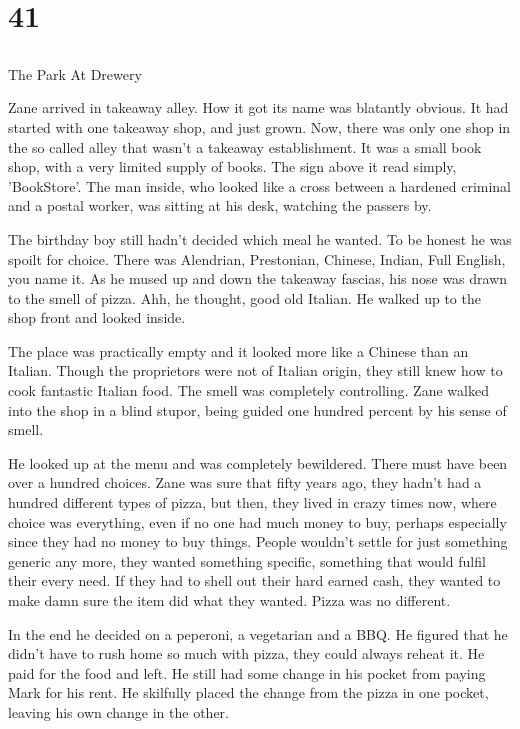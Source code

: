 \chapter{41}
\section{}
The Park At Drewery  

Zane arrived in takeaway alley.  How it got its name was blatantly obvious.  It had started with one takeaway shop, and just grown.  Now, there was only one shop in the so called alley that wasn't a takeaway establishment.  It was a small book shop, with a very limited supply of books.  The sign above it read simply, 'BookStore'.  The man inside, who looked like a cross between a hardened criminal and a postal worker, was sitting at his desk, watching the passers by.  

The birthday boy still hadn't decided which meal he wanted.  To be honest he was spoilt for choice.  There was Alendrian, Prestonian, Chinese, Indian, Full English, you name it.  As he mused up and down the takeaway fascias, his nose was drawn to the smell of pizza.  Ahh, he thought, good old Italian.  He walked up to the shop front and looked inside.  

The place was practically empty and it looked more like a Chinese than an Italian.  Though the proprietors were not of Italian origin, they still knew how to cook fantastic Italian food.  The smell was completely controlling.  Zane walked into the shop in a blind stupor, being guided one hundred percent by his sense of smell.

He looked up at the menu and was completely bewildered.  There must have been over a hundred choices.  Zane was sure that fifty years ago, they hadn't had a hundred different types of pizza, but then, they lived in crazy times now, where choice was everything, even if no one had much money to buy, perhaps especially since they had no money to buy things.  People wouldn't settle for just something generic any more, they wanted something specific, something that would fulfil their every need.  If they had to shell out their hard earned cash, they wanted to make damn sure the item did what they wanted.  Pizza was no different.

In the end he decided on a peperoni, a vegetarian and a BBQ.  He figured that he didn't have to rush home so much with pizza, they could always reheat it.  He paid for the food and left.  He still had some change in his pocket from paying Mark for his rent.  He skilfully placed the change from the pizza in one pocket, leaving his own change in the other.  

